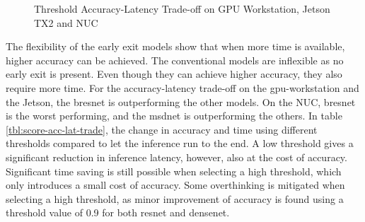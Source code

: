 \begin{figure}
	\caption[Threshold Accuracy-Latency Trade-off]{Threshold Accuracy-Latency Trade-off on \protect{} GPU Workstation, \protect{} Jetson TX2 and \protect{} NUC }
	\label{fig:threshold-acc-lat-trade-off-by-time}
\end{figure}

The flexibility of the early exit models show that when more time is available, higher accuracy can be achieved. The conventional models are inflexible as no early exit is present. Even though they can achieve higher accuracy, they also require more time.
For the accuracy-latency trade-off on the \gls{gpu}-workstation and the Jetson, the \gls{bresnet} is outperforming the other models. On the NUC, \gls{bresnet} is the worst performing, and the \gls{msdnet} is outperforming the others. In table \ref{tbl:score-acc-lat-trade}, the change in accuracy and time using different thresholds compared to let the inference run to the end.
A low threshold gives a significant reduction in inference latency, however, also at the cost of accuracy. Significant time saving is still possible when selecting a high threshold, which only introduces a small cost of accuracy. Some overthinking is mitigated when selecting a high threshold, as minor improvement of accuracy is found using a threshold value of 0.9 for both \gls{resnet} and \gls{densenet}.
